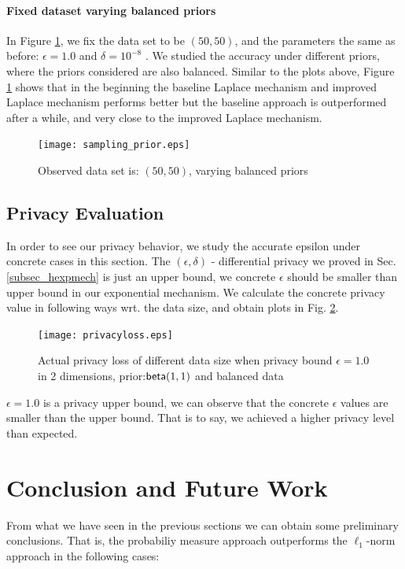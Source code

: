 \documentclass{article}
\begin{document}
\paragraph{Fixed dataset varying balanced priors}
\label{subsubsec_vs_prior}
In Figure \ref{fig_vs_prior}, we fix the data set to be $(50,50)$, and the parameters the same as before: $\epsilon = 1.0$ and $\delta = 10^{-8}$ . We studied the accuracy under different priors, where the priors considered  are also balanced.
Similar to the plots above, Figure \ref{fig_vs_prior} shows that in the beginning the baseline Laplace mechanism and improved Laplace mechanism performs better but the baseline approach is outperformed after a while, and very close to the improved Laplace mechanism.
\begin{figure}
\centering
\texttt{[image: sampling\_prior.eps]}
\caption{Observed data set is: $(50,50)$, varying balanced priors}
\label{fig_vs_prior}
\end{figure}

\subsection{Privacy Evaluation}
\label{subsec_experiment_privacy}
In order to see our privacy behavior, we study the accurate epsilon under concrete cases in this section. The $(\epsilon, \delta)$ - differential privacy we proved in Sec. \ref{subsec_hexpmech} is just an upper bound, we concrete $\epsilon$ should be smaller than upper bound in our exponential mechanism. We calculate the concrete privacy value in following ways wrt. the data size, and obtain plots in Fig. \ref{fig_privacy}.

\begin{figure}
\begin{center}
\centering
    \texttt{[image: privacyloss.eps]}
\caption{Actual privacy loss of different data size when privacy bound $\epsilon = 1.0$ in 2 dimensions, prior:$\mathsf{beta}(1,1)$ and balanced data}
\label{fig_privacy}
\end{center}
\end{figure}

$\epsilon = 1.0$ is a privacy upper bound, we can observe that the concrete $\epsilon$ values are smaller than the upper bound. That is to say, we achieved a higher privacy level than expected. 

\section{Conclusion and Future Work}
From what we have seen in the previous sections we can obtain some preliminary conclusions. That is, the probabiliy measure approach outperforms the $\ell_1$-norm approach in the following cases:
\end{document}
